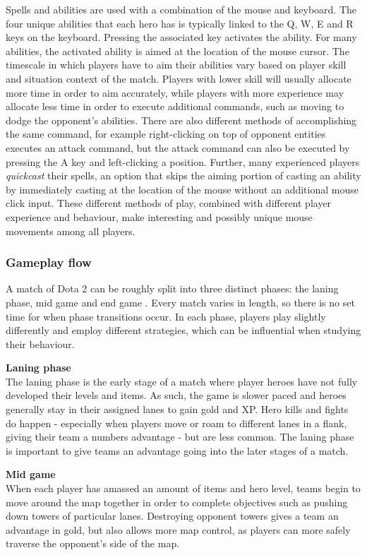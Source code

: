 \documentclass[Report.tex]{subfiles}
\begin{document}
Spells and abilities are used with a combination of the mouse and keyboard. The four unique abilities that each hero has is typically linked to the Q, W, E and R keys on the keyboard. Pressing the associated key activates the ability. For many abilities, the activated ability is aimed at the location of the mouse cursor. The timescale in which players have to aim their abilities vary based on player skill and situation context of the match. Players with lower skill will usually allocate more time in order to aim accurately, while players with more experience may allocate less time in order to execute additional commands, such as moving to dodge the opponent's abilities. There are also different methods of accomplishing the same command, for example right-clicking on top of opponent entities executes an attack command, but the attack command can also be executed by pressing the A key and left-clicking a position. Further, many experienced players \textit{quickcast} their spells, an option that skips the aiming portion of casting an ability by immediately casting at the location of the mouse without an additional mouse click input. These different methods of play, combined with different player experience and behaviour, make interesting and possibly unique mouse movements among all players. 

\subsubsection{Gameplay flow}
A match of Dota 2 can be roughly split into three distinct phases: the laning phase, mid game and end game \cite{dota-phases}. Every match varies in length, so there is no set time for when phase transitions occur. In each phase, players play slightly differently and employ different strategies, which can be influential when studying their behaviour. 

\textbf{Laning phase} \\
The laning phase is the early stage of a match where player heroes have not fully developed their levels and items. As such, the game is slower paced and heroes generally stay in their assigned lanes to gain gold and XP. Hero kills and fights do happen - especially when players move or roam to different lanes in a flank, giving their team a numbers advantage - but are less common. The laning phase is important to give teams an advantage going into the later stages of a match. 

\textbf{Mid game} \\
When each player has amassed an amount of items and hero level, teams begin to move around the map together in order to complete objectives such as pushing down towers of particular lanes. Destroying opponent towers gives a team an advantage in gold, but also allows more map control, as players can more safely traverse the opponent's side of the map. 
\end{document}
